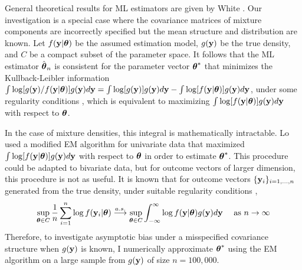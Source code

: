 General theoretical results for ML estimators are given by White \cite{white1982}. Our investigation is a special case where the covariance matrices of mixture components are incorrectly specified but the mean structure and distribution are known. Let $f(\mathbf y|\boldsymbol \theta)$ be the assumed estimation model, $g(\mathbf y)$ be the true density, and $C$ be a compact subset of the parameter space. It follows that the ML estimator $\hat{\boldsymbol\theta}_{n}$ is consistent for the parameter vector $\boldsymbol\theta^{*}$ that minimizes the Kullback-Leibler information $\int \log[g(\mathbf y)/f(\mathbf y|\boldsymbol\theta)]g(\mathbf y)d\mathbf y=\int \log[g(\mathbf y)]g(\mathbf y)d\mathbf y-\int \log[f(\mathbf y|\boldsymbol\theta)]g(\mathbf y)d\mathbf y$, under some regularity conditions \cite{white1982}, which is equivalent to maximizing $\int \log[f(\mathbf y|\boldsymbol\theta)]g(\mathbf y)d\mathbf y$ with respect to $\boldsymbol\theta$.  

In the case of mixture densities, this integral is mathematically intractable. Lo \cite{lo2011} used a modified EM algorithm for univariate data that maximized $\int \log[f(\mathbf y|\boldsymbol\theta)]g(\mathbf y)d\mathbf y$  with respect to $\boldsymbol \theta$ in order to estimate $\boldsymbol\theta^{*}$. This procedure could be adapted to bivariate data, but for outcome vectors of larger dimension, this procedure is not as useful.  It is known that for outcome vectors $\{\mathbf y_i\}_{i=1,...,n}$ generated from the true density, under suitable regularity conditions \cite{jennrich1969},
$$\sup_{\boldsymbol \theta\in C}\frac{1}{n}\sum_{i=1}^{n} \log f(\mathbf y_{i}|\boldsymbol \theta)\overset{a.s.}{\longrightarrow} \sup_{\boldsymbol \theta\in C} \int^{\infty}_{-\infty} \log f(\mathbf y|\boldsymbol \theta)g(\mathbf y)d\mathbf y \quad \text{ as } n\rightarrow \infty$$
Therefore, to investigate asymptotic bias under a misspecified covariance structure when $g(\mathbf y)$ is known, I numerically approximate $\boldsymbol\theta^{*}$ using the EM algorithm on a large sample from $g(\mathbf y)$ of size $n=100,000$. 

